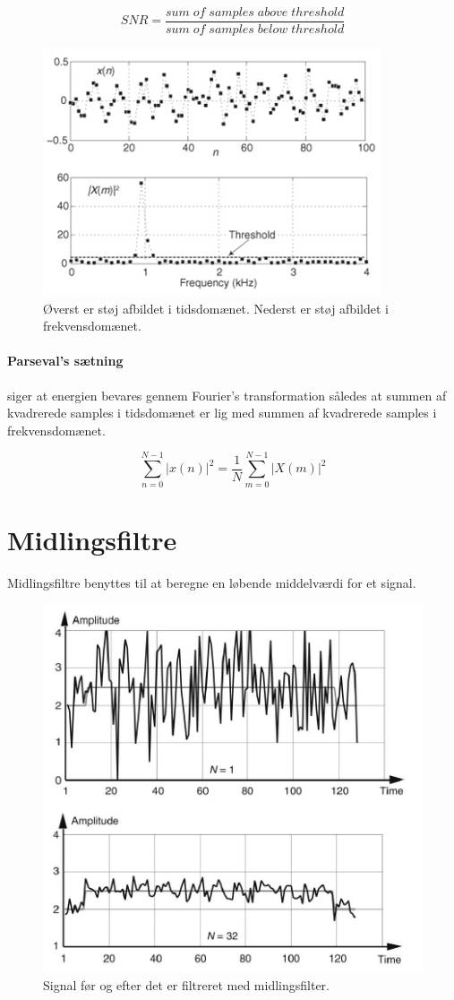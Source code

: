 \documentclass[danish]{article}
\begin{document}
\begin{equation}
SNR=  \frac{sum\;of\;samples\;above\;threshold}{sum\;of\;samples\;below\;threshold}
\end{equation}

\begin{figure} [H]
	\centering
	\includegraphics[width=0.6\linewidth]{graphics/snr}
	\caption{Øverst er støj afbildet i tidsdomænet. Nederst er støj afbildet i frekvensdomænet. }
	\label{fig:snr}
\end{figure}

\paragraph{Parseval's sætning} siger at energien bevares gennem Fourier’s transformation således at summen af kvadrerede samples i tidsdomænet er lig med summen af kvadrerede samples i frekvensdomænet.

\begin{equation}
\sum_{n=0}^{N-1}|x(n)|^2 = \frac{1}{N} \sum_{m=0}^{N-1}|X(m)|^2
\end{equation}


\newpage
\section{Midlingsfiltre}
Midlingsfiltre benyttes til at beregne en løbende middelværdi for et signal. 

\begin{figure} [H]
	\centering
	\includegraphics[width=0.4\linewidth]{graphics/ma}
	\caption{Signal før og efter det er filtreret med midlingsfilter.}
	\label{fig:ma}
\end{figure}
\end{document}
